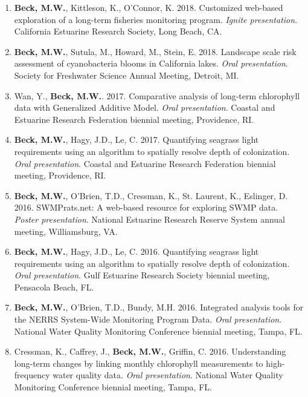 \documentclass[letterpaper,12pt]{article}
\begin{document}
\begin{enumerate}
\item {\bf Beck, M.W.}, Kittleson, K., O'Connor, K. 2018. Customized web-based exploration of a long-term fisheries monitoring program. \textit{Ignite presentation}. California Estuarine Research Society, Long Beach, CA.

\item {\bf Beck, M.W.}, Sutula, M., Howard, M., Stein, E. 2018. Landscape scale risk assessment of cyanobacteria blooms in California lakes. \textit{Oral presentation}. Society for Freshwater Science Annual Meeting, Detroit, MI.

\item Wan, Y., {\bf Beck, M.W.}. 2017. Comparative analysis of long-term chlorophyll data with Generalized Additive Model. \textit{Oral presentation}. Coastal and Estuarine Research Federation biennial meeting, Providence, RI.

\item {\bf Beck, M.W.}, Hagy, J.D., Le, C. 2017. Quantifying seagrass light requirements using an algorithm to spatially resolve depth of colonization. \textit{Oral presentation}. Coastal and Estuarine Research Federation biennial meeting, Providence, RI.

\item {\bf Beck, M.W.}, O'Brien, T.D., Cressman, K., St. Laurent, K., Eslinger, D. 2016. SWMPrats.net: A web-based resource for exploring SWMP data. \textit{Poster presentation}. National Estuarine Research Reserve System annual meeting, Williamsburg, VA. 

\item {\bf Beck, M.W.}, Hagy, J.D., Le, C. 2016. Quantifying seagrass light requirements using an algorithm to spatially resolve depth of colonization. \textit{Oral presentation}. Gulf Estuarine Research Society biennial meeting, Pensacola Beach, FL.

\item {\bf Beck, M.W.}, O'Brien, T.D., Bundy, M.H. 2016. Integrated analysis tools for the NERRS System-Wide Monitoring Program Data. \textit{Oral presentation}. National Water Quality Monitoring Conference biennial meeting, Tampa, FL.

\item Cressman, K., Caffrey, J., {\bf Beck, M.W.}, Griffin, C. 2016. Understanding long-term changes by linking monthly chlorophyll measurements to high-frequency water quality data. \textit{Oral presentation}. National Water Quality Monitoring Conference biennial meeting, Tampa, FL.


\end{enumerate}
\end{document}
